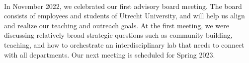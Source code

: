 \documentclass{report}
\begin{document}
\clearpage
\begin{figure}
    \centering
\end{figure}
\clearpage

 \\

In November 2022, we celebrated our first advisory board meeting. The board consists of employees and students of Utrecht University, and will help us align and realize our teaching and outreach goals. At the first meeting, we were discussing relatively broad strategic questions such as community building, teaching, and how to orchestrate an interdisciplinary lab that needs to connect with all departments. Our next meeting is scheduled for Spring 2023.
\end{document}
